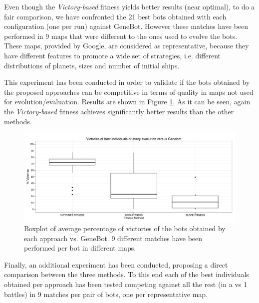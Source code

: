 \documentclass[preprint]{elsarticle}
\begin{document}
Even though the \textit{Victory-based} fitness yields better results
(near optimal), to do a fair comparison, we have confronted the 21
best bots obtained with each configuration (one per run) against
GeneBot. However these matches have been performed in 9 maps that were
different to the ones used to evolve the bots. These %
maps, provided by Google, are considered as representative, because they have different features to promote a wide set of strategies, i.e. different distributions of planets, sizes and number of initial ships. 

This experiment has been conducted in order to validate if the bots obtained by the proposed approaches can be competitive in terms of quality in maps not used for evolution/evaluation. Results are shown in Figure \ref{figura:boxplotvictoriesgenebot}. As it can be seen, again the \textit{Victory-based} fitness achieves significantly better results than the other methods.


\begin{figure}[ht]
 \begin{center}
   \includegraphics[width=12cm]{nuevas_imgs/vsGENEBOT_Boxplot.pdf}
 \end{center}
 \caption{Boxplot of average percentage of victories of the bots obtained by each approach vs. GeneBot. 9 different matches have been performed per bot in different maps.} 
 \label{figura:boxplotvictoriesgenebot}
 \end{figure}

Finally, an additional experiment has been conducted, proposing a direct comparison between the three methods. To this end each of the best individuals obtained per approach has been tested competing against all the rest (in a vs 1 battles) in 9 matches per pair of bots, one per representative map.
\end{document}
